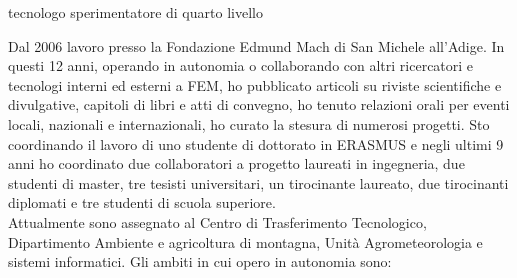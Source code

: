 \documentclass{curriculum}
\begin{document}
    \pagestyle{firstpage}
   {tecnologo sperimentatore di quarto livello}
  
    Dal 2006 lavoro presso la Fondazione Edmund Mach di San Michele all'Adige. In questi 12 anni, operando in autonomia o collaborando con altri ricercatori e tecnologi interni ed esterni a FEM,  ho pubblicato articoli su riviste scientifiche e divulgative, capitoli di libri e atti di convegno, ho tenuto relazioni orali per eventi locali, nazionali e internazionali, ho curato la stesura di numerosi progetti.
    Sto coordinando il lavoro di uno studente di dottorato in ERASMUS e negli ultimi 9 anni ho coordinato due collaboratori a progetto laureati in ingegneria, due studenti di master, tre tesisti universitari, un tirocinante laureato, due tirocinanti diplomati e tre studenti di scuola superiore.\\
    Attualmente sono assegnato al Centro di Trasferimento Tecnologico, Dipartimento Ambiente e agricoltura di montagna, Unità Agrometeorologia e sistemi informatici. Gli ambiti in cui opero in autonomia sono:\vspace{0.33 cm}
    
\end{document}
